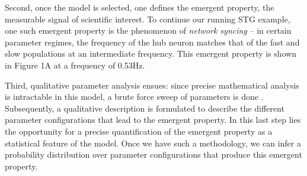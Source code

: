 \documentclass[11pt]{article}
\begin{document}
Second, once the model is selected, one defines the emergent property, the measurable signal of scientific interest.  
To continue our running STG example, one such emergent property is the phenomenon of \emph{network syncing} -- in certain parameter regimes, the frequency of the hub neuron matches that of the fast and slow populations at an intermediate frequency.  This emergent property is shown in Figure 1A at a frequency of 0.53Hz.

Third, qualitative parameter analysis ensues: since precise mathematical analysis is intractable in this model, a brute force sweep of parameters is done \cite{gutierrez2013multiple}.  Subsequently, a qualitative description is formulated to describe the different parameter configurations that lead to the emergent property.  
In this last step lies the opportunity for a precise quantification of the emergent property as a statistical feature of the model.  Once we have such a methodology, we can infer a probability distribution over parameter configurations that produce this emergent property. 
\end{document}
